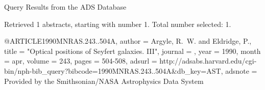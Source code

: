 Query Results from the ADS Database


Retrieved 1 abstracts, starting with number 1.  Total number selected: 1.

@ARTICLE{1990MNRAS.243..504A,
   author = {{Argyle}, R.~W. and {Eldridge}, P.},
    title = "{Optical positions of Seyfert galaxies. III}",
  journal = {\mnras},
     year = 1990,
    month = apr,
   volume = 243,
    pages = {504-508},
   adsurl = {http://adsabs.harvard.edu/cgi-bin/nph-bib_query?bibcode=1990MNRAS.243..504A&db_key=AST},
  adsnote = {Provided by the Smithsonian/NASA Astrophysics Data System}
}


